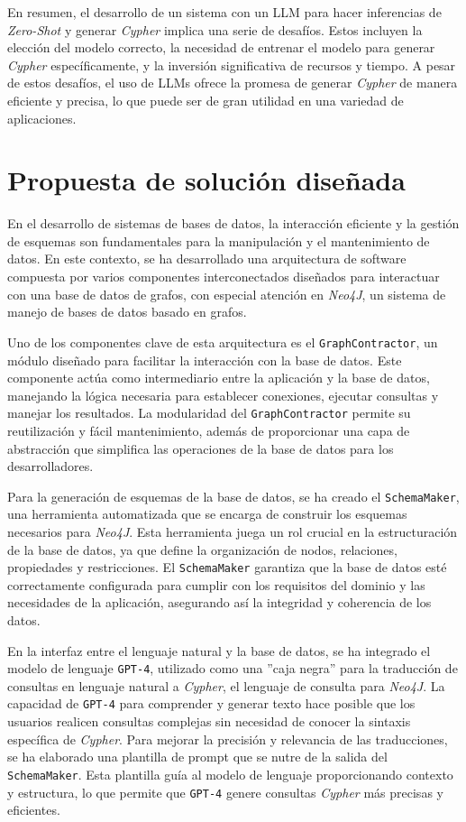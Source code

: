 En resumen, el desarrollo de un sistema con un LLM para hacer inferencias de \textit{Zero-Shot} y generar \textit{Cypher} implica una serie de desafíos. Estos incluyen la elección del modelo correcto, la necesidad de entrenar el modelo para generar \textit{Cypher} específicamente, y la inversión significativa de recursos y tiempo. A pesar de estos desafíos, el uso de LLMs ofrece la promesa de generar \textit{Cypher} de manera eficiente y precisa, lo que puede ser de gran utilidad en una variedad de aplicaciones.

\section{Propuesta de solución diseñada} \label{designed_proposal}

En el desarrollo de sistemas de bases de datos, la interacción eficiente y la gestión de esquemas son fundamentales para la manipulación y el mantenimiento de datos. En este contexto, se ha desarrollado una arquitectura de software compuesta por varios componentes interconectados diseñados para interactuar con una base de datos de grafos, con especial atención en \textit{Neo4J}, un sistema de manejo de bases de datos basado en grafos.

Uno de los componentes clave de esta arquitectura es el \texttt{GraphContractor}, un módulo diseñado para facilitar la interacción con la base de datos. Este componente actúa como intermediario entre la aplicación y la base de datos, manejando la lógica necesaria para establecer conexiones, ejecutar consultas y manejar los resultados. La modularidad del \texttt{GraphContractor} permite su reutilización y fácil mantenimiento, además de proporcionar una capa de abstracción que simplifica las operaciones de la base de datos para los desarrolladores.

Para la generación de esquemas de la base de datos, se ha creado el \texttt{SchemaMaker}, una herramienta automatizada que se encarga de construir los esquemas necesarios para \textit{Neo4J}. Esta herramienta juega un rol crucial en la estructuración de la base de datos, ya que define la organización de nodos, relaciones, propiedades y restricciones. El \texttt{SchemaMaker} garantiza que la base de datos esté correctamente configurada para cumplir con los requisitos del dominio y las necesidades de la aplicación, asegurando así la integridad y coherencia de los datos.

En la interfaz entre el lenguaje natural y la base de datos, se ha integrado el modelo de lenguaje \texttt{GPT-4}, utilizado como una ''caja negra'' para la traducción de consultas en lenguaje natural a \textit{Cypher}, el lenguaje de consulta para \textit{Neo4J}. La capacidad de \texttt{GPT-4} para comprender y generar texto hace posible que los usuarios realicen consultas complejas sin necesidad de conocer la sintaxis específica de \textit{Cypher}. Para mejorar la precisión y relevancia de las traducciones, se ha elaborado una plantilla de prompt que se nutre de la salida del \texttt{SchemaMaker}. Esta plantilla guía al modelo de lenguaje proporcionando contexto y estructura, lo que permite que \texttt{GPT-4} genere consultas \textit{Cypher} más precisas y eficientes.


